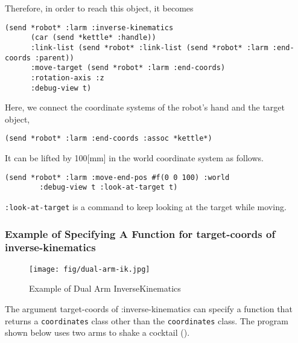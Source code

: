 Therefore, in order to reach this object, it becomes
{\baselineskip=10pt
\begin{verbatim}
(send *robot* :larm :inverse-kinematics
      (car (send *kettle* :handle))
      :link-list (send *robot* :link-list (send *robot* :larm :end-coords :parent))
      :move-target (send *robot* :larm :end-coords)
      :rotation-axis :z
      :debug-view t)
\end{verbatim}
}


Here, we connect the coordinate systems of the robot's hand and the target object,
{\baselineskip=10pt
\begin{verbatim}
(send *robot* :larm :end-coords :assoc *kettle*)
\end{verbatim}
}

It can be lifted by 100[mm] in the world coordinate system as follows.
{\baselineskip=10pt
\begin{verbatim}
(send *robot* :larm :move-end-pos #f(0 0 100) :world
        :debug-view t :look-at-target t)
\end{verbatim}
}
\verb|:look-at-target| is a command to keep looking at the target while moving.

\subsubsection{Example of Specifying A Function for target-coords of inverse-kinematics}

\begin{figure}[htb]
  \begin{center}
    \texttt{[image: fig/dual-arm-ik.jpg]}
    \caption{Example of Dual Arm InverseKinematics}
  \end{center}
\end{figure}

The argument target-coords of :inverse-kinematics can specify a function that returns a \verb|coordinates| class other than the \verb|coordinates| class.
The program shown below uses two arms to shake a cocktail ().

